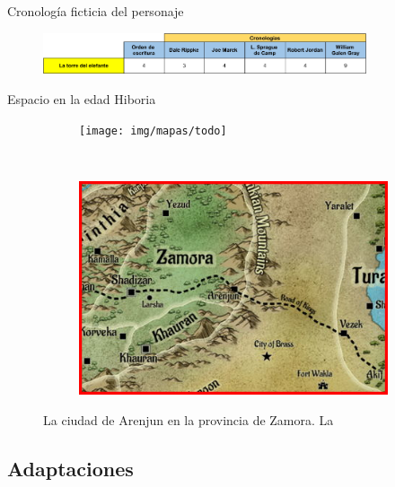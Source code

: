 \begin{frame}{Cronología ficticia del personaje}
\begin{figure}[htb]
  \centering
  \includegraphics[width=0.85\textwidth]{img/Cronollogias}
\end{figure}
\end{frame}

\begin{frame}{Espacio en la edad Hiboria}
\begin{figure}[htp]
 \centering
 \begin{subfigure}[b]{0.48\textwidth}
   \texttt{[image: img/mapas/todo]}
 \end{subfigure}
~
 \begin{subfigure}[b]{0.48\textwidth}
   \includegraphics[width=\textwidth]{img/mapas/inset}
 \end{subfigure}
 \caption{La ciudad de Arenjun en la provincia de Zamora. La }
 \end{figure}
\end{frame}

\subsection{Adaptaciones}

